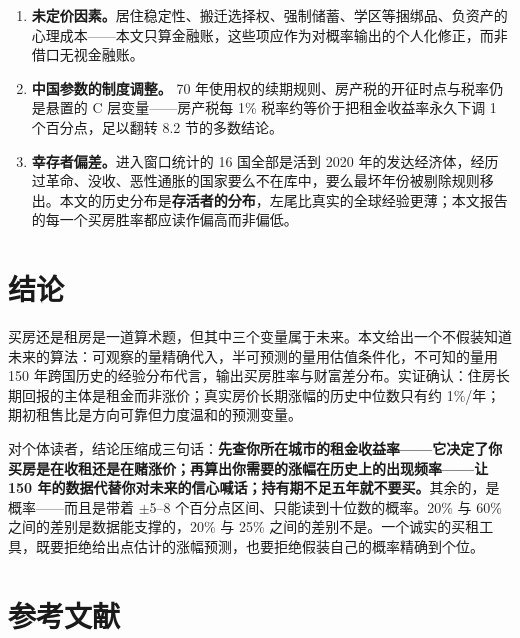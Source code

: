 \documentclass[11pt,a4paper]{ctexart}
\begin{document}
\begin{enumerate}
特异性风险\textbf{并不}系统性利好租房：它把胜率拉向五五开（画像 A 从 20\% 升到 31\%），而\textbf{财富差中位数纹丝不动（$-$32\%）}，左尾明显变厚。这暴露了 P(买优于租) 作为决策统计量的缺陷：\textbf{在期望明确为负的市场里，加大不确定性会让胜率变好看}——赢面上升的方式和买彩票一样。这正是本文始终把财富差的中位数与 90\% 区间和胜率并列输出的原因。
\item \textbf{未定价因素。}居住稳定性、搬迁选择权、强制储蓄、学区等捆绑品、负资产的心理成本——本文只算金融账，这些项应作为对概率输出的个人化修正，而非借口无视金融账。
\item \textbf{中国参数的制度调整。} 70 年使用权的续期规则、房产税的开征时点与税率仍是悬置的 C 层变量——房产税每 1\% 税率约等价于把租金收益率永久下调 1 个百分点，足以翻转 8.2 节的多数结论。
\item \textbf{幸存者偏差。}进入窗口统计的 16 国全部是活到 2020 年的发达经济体，经历过革命、没收、恶性通胀的国家要么不在库中，要么最坏年份被剔除规则移出。本文的历史分布是\textbf{存活者的分布}，左尾比真实的全球经验更薄；本文报告的每一个买房胜率都应读作偏高而非偏低。
\end{enumerate}

\section{结论}

买房还是租房是一道算术题，但其中三个变量属于未来。本文给出一个不假装知道未来的算法：可观察的量精确代入，半可预测的量用估值条件化，不可知的量用 150 年跨国历史的经验分布代言，输出买房胜率与财富差分布。实证确认：住房长期回报的主体是租金而非涨价；真实房价长期涨幅的历史中位数只有约 1\%/年；期初租售比是方向可靠但力度温和的预测变量。

对个体读者，结论压缩成三句话：\textbf{先查你所在城市的租金收益率——它决定了你买房是在收租还是在赌涨价；再算出你需要的涨幅在历史上的出现频率——让 150 年的数据代替你对未来的信心喊话；持有期不足五年就不要买。}其余的，是概率——而且是带着 $\pm$5--8 个百分点区间、只能读到十位数的概率。20\% 与 60\% 之间的差别是数据能支撑的，20\% 与 25\% 之间的差别不是。一个诚实的买租工具，既要拒绝给出点估计的涨幅预测，也要拒绝假装自己的概率精确到个位。

\section*{参考文献}
\end{document}

